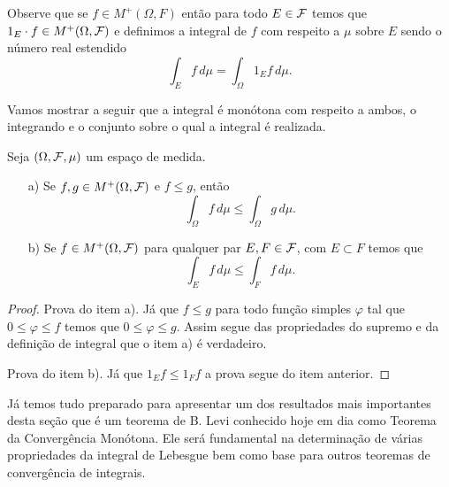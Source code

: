 Observe que se $f\in M^{+}(\Omega,F)$ então para
todo $E\in\mathcal{F}$ temos que $1_E\cdot f\in M^{+}(\Omega,\mathcal{F})$
e definimos a integral de $f$ com respeito a $\mu$ 
sobre $E$ sendo o número real estendido 
	\[
		\int_{E} f\, d\mu
		=
		\int_{\Omega} 1_{E}f\, d\mu.
	\]

Vamos mostrar a seguir que a integral é monótona 
com respeito a ambos, o integrando e o conjunto
sobre o qual a integral é realizada.






\begin{lema}
\label{lema-monotonicidade-integral-funcao-nao-negativas}
Seja $(\Omega,\mathcal{F},\mu)$ um espaço de medida.
\begin{itemize}
	\item[a)]
	Se $f,g\in M^{+}(\Omega,\mathcal{F})$	 e $f\leq g$, então 
		\[
			\int_{\Omega} f\, d\mu
			\leq
			\int_{\Omega} g\, d\mu.
		\]
	
	\item[b)] 
	Se $f\in M^{+}(\Omega,\mathcal{F})$ para 
	qualquer par $E,F\in \mathcal{F}$, com 
	$E\subset F$ temos que 
		\[
			\int_{E} f\, d\mu
			\leq
			\int_{F} f\, d\mu.
		\]
	 
\end{itemize}
\end{lema}





\begin{proof}
Prova do item a). 
Já que $f\leq g$ para todo função simples $\varphi$ 
tal que $0\leq \varphi\leq f$ temos que $0\leq \varphi\leq g$.
Assim segue das propriedades do supremo e da definição de 
integral que o item a) é verdadeiro.

Prova do item b). Já que $1_{E}f\leq 1_{F}f$
a prova segue do item anterior.
\end{proof}

\bigskip

Já temos tudo preparado para apresentar um dos resultados
mais importantes desta seção que é um teorema de B. Levi 
conhecido hoje em dia como Teorema da Convergência Monótona.
Ele será fundamental na determinação de várias propriedades
da integral de Lebesgue bem como base para outros teoremas 
de convergência de integrais. 













